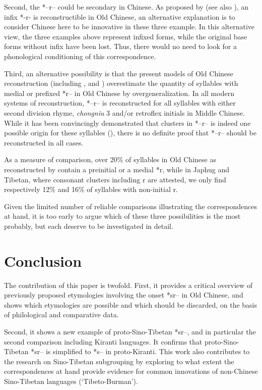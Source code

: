 \documentclass[oldfontcommands,oneside,a4paper,11pt]{article}
\newcommand{\ipa}[1]{{\phon #1}} %
\begin{document}
Second, the *\ipa{--r--} could be secondary in Chinese. As proposed by \citet{sagart99roc} (see also \citealt[57-8]{bs14oc}), an infix *\ipa{-r-} is reconstructible in Old Chinese, an alternative explanation is to consider Chinese here to be innovative in these three example. In this alternative view, the three examples above represent infixed forms, while the original base forms without infix have been lost. Thus, there would no need to look for a phonological conditioning of this correspondence.

Third, an alternative possibility is that the present models of Old Chinese reconstruction (including \citealt{starostin89}, \citealt{schuessler09minimal} and \citealt{bs14oc}) overestimate the quantity of syllables with medial or prefixed *\ipa{r}-- in Old Chinese by overgeneralization. In all modern systems of reconstruction,  *--\ipa{r}--  is reconstructed for all syllables with either second division rhyme, 	\textit{chongniu} 3 and/or retroflex initials in Middle Chinese. While it has been convincingly demonstrated that clusters in *--\ipa{r}-- is indeed one possible origin for these syllables (\citealt{yakhontov61sochetaniya}), there is no definite proof that  *--\ipa{r}-- should be reconstructed in all cases. 

As a measure of comparison, over 20\% of syllables in Old Chinese as reconstructed by \citet{bs14oc} contain a preinitial or a medial *\ipa{r}, while in Japhug and Tibetan, where consonant clusters including \ipa{r} are attested, we only find respectively 12\% and 16\% of syllables with non-initial \ipa{r}. 

Given the limited number of reliable comparisons illustrating the correspondences at hand, it is too early to argue which of these three possibilities is the most probably, but each deserve to be investigated in detail.

\section{Conclusion}

The contribution of this paper is twofold. First, it provides a critical overview of previously proposed etymologies involving the onset *\ipa{sr--} in Old Chinese, and shows which etymologies are possible and which should be discarded, on the basis of philological and comparative data.

Second, it shows a new example of proto-Sino-Tibetan *\ipa{sr--}, and in particular the second comparison including Kiranti languages. It confirms that proto-Sino-Tibetan *\ipa{sr--} is simplified to *\ipa{s--} in proto-Kiranti. This work also contributes to the research on Sino-Tibetan subgrouping by exploring to what extent the correspondences at hand provide evidence for common innovations of non-Chinese Sino-Tibetan languages (`Tibeto-Burman').
\end{document}
